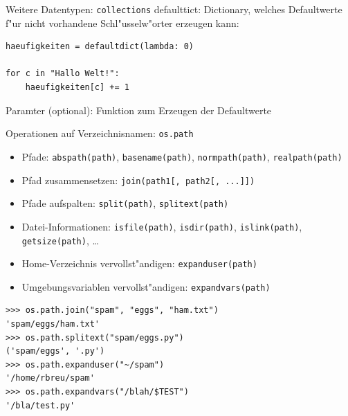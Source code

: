 \begin{frame}[fragile]{Weitere Datentypen: \texttt{collections}}
\alert{defaulttict}: Dictionary, welches Defaultwerte f"ur nicht vorhandene Schl"usselw"orter erzeugen kann:
\begin{lstlisting}
haeufigkeiten = defaultdict(lambda: 0)

for c in "Hallo Welt!":
    haeufigkeiten[c] += 1
\end{lstlisting}
Paramter (optional): Funktion zum Erzeugen der Defaultwerte

\end{frame}


\begin{frame}[fragile]{Operationen auf Verzeichnisnamen: \texttt{os.path}}
\begin{itemize}
\item Pfade: \texttt{abspath(path)}, \texttt{basename(path)}, \texttt{normpath(path)}, \texttt{realpath(path)}
\item Pfad zusammensetzen: \texttt{join(path1[, path2[, ...]])}
\item Pfade aufspalten: \texttt{split(path)}, \texttt{splitext(path)}
\item Datei-Informationen: \texttt{isfile(path)}, \texttt{isdir(path)}, \texttt{islink(path)}, \texttt{getsize(path)}, \dots
\item Home-Verzeichnis vervollst"andigen: \texttt{expanduser(path)}
\item Umgebungsvariablen vervollst"andigen: \texttt{expandvars(path)}
\end{itemize} 
\begin{lstlisting}[style=Shell]
>>> os.path.join("spam", "eggs", "ham.txt")
'spam/eggs/ham.txt'
>>> os.path.splitext("spam/eggs.py")
('spam/eggs', '.py')
>>> os.path.expanduser("~/spam")
'/home/rbreu/spam'
>>> os.path.expandvars("/blah/$TEST")
'/bla/test.py'
\end{lstlisting}%
\end{frame}

